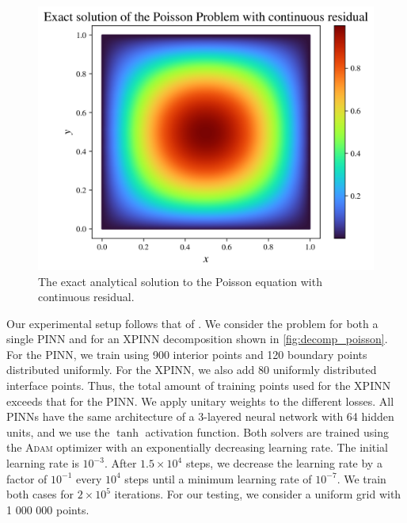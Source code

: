 \begin{figure}[h]
    \centering
    \includegraphics[width=0.8\linewidth]{Project1XPINNs/figures/Poisson/smooth_Poisson_true.png}
    \caption{The exact analytical solution to the Poisson equation with continuous residual.}
    \label{fig:exact_smooth}
\end{figure}

Our experimental setup follows that of \textcite{müller2023achieving}.
We consider the problem for both a single PINN and for an XPINN decomposition shown in \autoref{fig:decomp_poisson}.
For the PINN, we train using 900 interior points and 120 boundary points distributed uniformly.
For the XPINN, we also add 80 uniformly distributed interface points. Thus, the total amount of training points used for the XPINN exceeds that for the PINN.
We apply unitary weights to the different losses.
All PINNs have the same architecture of a 3-layered neural network with 64 hidden units, and we use the $\tanh$ activation function. 
Both solvers are trained using the \textsc{Adam} optimizer with an exponentially decreasing learning rate.
The initial learning rate is $10^{-3}$.
After $1.5\times 10^4$ steps, we decrease the learning rate by a factor of $10^{-1}$ every $10^4$ steps until a minimum learning rate of $10^{-7}$.
We train both cases for $2\times 10^5$ iterations. For our testing, we consider a uniform grid with 1 000 000 points. 

